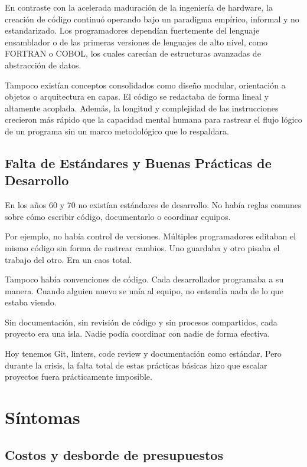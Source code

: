 \documentclass{./plantilla/umss}
\begin{document}
En contraste con la acelerada maduración de la ingeniería de hardware, la creación de código continuó operando bajo un paradigma empírico, informal y no estandarizado. Los programadores dependían fuertemente del lenguaje ensamblador o de las primeras versiones de lenguajes de alto nivel, como FORTRAN o COBOL, los cuales carecían de estructuras avanzadas de abstracción de datos.

Tampoco existían conceptos consolidados como diseño modular, orientación a objetos o arquitectura en capas. El código se redactaba de forma lineal y altamente acoplada. Además, la longitud y complejidad de las instrucciones crecieron más rápido que la capacidad mental humana para rastrear el flujo lógico de un programa sin un marco metodológico que lo respaldara.

\subsection{Falta de Estándares y Buenas Prácticas de Desarrollo}

En los años 60 y 70 no existían estándares de desarrollo. No había reglas comunes sobre cómo escribir código, documentarlo o coordinar equipos.

Por ejemplo, no había control de versiones. Múltiples programadores editaban el mismo código sin forma de rastrear cambios. Uno guardaba y otro pisaba el trabajo del otro. Era un caos total.

Tampoco había convenciones de código. Cada desarrollador programaba a su manera. Cuando alguien nuevo se unía al equipo, no entendía nada de lo que estaba viendo.

Sin documentación, sin revisión de código y sin procesos compartidos, cada proyecto era una isla. Nadie podía coordinar con nadie de forma efectiva.

Hoy tenemos Git, linters, code review y documentación como estándar. Pero durante la crisis, la falta total de estas prácticas básicas hizo que escalar proyectos fuera prácticamente imposible.

\section{Síntomas}

\subsection{Costos y desborde de presupuestos}
\end{document}
